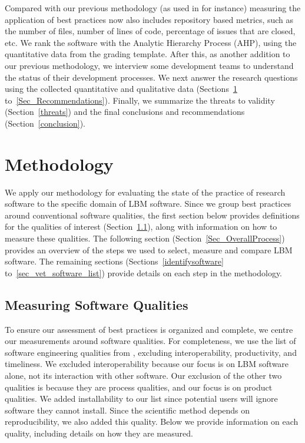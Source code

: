 \documentclass[final, 3p, times, authoryear]{elsarticle}
\begin{document}
Compared with our previous methodology (as used in \citet{SmithEtAl2016} for
instance) %
measuring the application of best practices now also includes repository based
metrics, such as the number of files, number of lines of code, percentage of
issues that are closed, etc.  We rank the software with the Analytic Hierarchy
Process (AHP), using the quantitative data from the grading template. After
this, as another addition to our previous methodology, we interview some
development teams to understand the status of their development processes. We
next answer the research questions using the collected quantitative and
qualitative data (Sections~\ref{methodology} to~\ref{Sec_Recommendations}).
Finally, we summarize the threats to validity (Section~\ref{threats}) and the
final conclusions and recommendations (Section~\ref{conclusion}).

\section{Methodology} \label{methodology}

We apply our methodology for evaluating the state of the practice of research
software \citep{SmithEtAl2021, SmithAndMichalski2022} %
to the specific domain of
LBM software.  Since we group best practices around conventional software
qualities, the first section below provides definitions for the qualities of
interest (Section~\ref{softwarequalities}), along with information on how to
measure these qualities. The following section
(Section~\ref{Sec_OverallProcess}) provides an overview of the steps we used to
select, measure and compare LBM software.  The remaining sections
(Sections~\ref{identifysoftware} to~\ref{sec_vet_software_list}) provide details
on each step in the methodology. 

\subsection{Measuring Software Qualities} \label{softwarequalities}

To ensure our assessment of best practices is organized and complete, we centre
our measurements around software qualities. For completeness, we use the list of
software engineering qualities from \citet[p.\ 17--33]{GhezziEtAl2003},
excluding interoperability, productivity, and timeliness. We excluded
interoperability because our focus is on LBM software alone, not its interaction
with other software. Our exclusion of the other two qualities is because they
are process qualities, and our focus is on product qualities. We added
installability to our list since potential users will ignore software they
cannot install.  Since the scientific method depends on reproducibility, we also
added this quality. Below we provide information on each quality, including
details on how they are measured. 
\end{document}
